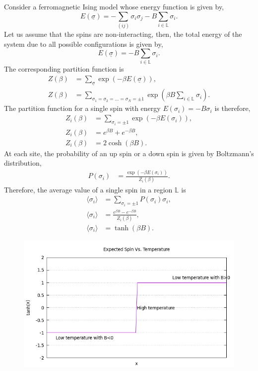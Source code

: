 \documentclass[letterpaper,english,10pt]{article}
\begin{document}
\begin{defn} Consider a ferromagnetic Ising model whose energy function is given by,
$$E(\underline{\sigma}) = -\sum_{(ij)}\sigma_{i}\sigma_{j} - B \sum_{i\in \mathbb{L}}\sigma_{i}.$$
Let us assume that the spins are non-interacting, then, the total energy of the system due to all possible configurations is given by,
\begin{equation}
E(\underline{\sigma}) = - B \sum_{i\in \mathbb{L}}\sigma_{i}.
\end{equation}
The corresponding partition function is
\begin{align}
Z(\beta) &= \sum_{\underline{\sigma}}\exp(-\beta E(\underline{\sigma})),\nonumber\\  
Z(\beta) &= \sum_{\sigma_{1}=\sigma_{2}=\ldots=\sigma_{N} = \pm 1}\exp(\beta B \sum_{i\in \mathbb{L}}\sigma_{i}).
\end{align}
The partition function for a single spin with energy            $E(\sigma_{i}) = -B\sigma_{i}$ is therefore,
\begin{align}
Z_{i}(\beta) &= \sum_{\sigma_{i} = \pm 1}\exp(-\beta E(\sigma_{i})),\nonumber\\  
Z_{i}(\beta) &= e^{\beta B}+ e^{-\beta B},\nonumber\\
Z_{i}(\beta) &= 2\cosh(\beta B).
\end{align}
At each site, the probability of an up spin or a down spin is given by Boltzmann's distribution,
\begin{align}
P(\sigma_{i}) &= \frac{\exp(-\beta E(\sigma_{i}))}{Z_{i}(\beta)}.
\end{align}
Therefore, the average value of a single spin in a region $\mathbb{L}$ is
\begin{align}
\langle\sigma_{i}\rangle &= \sum_{\sigma_{i}=\pm 1}P(\sigma_{i})\sigma_{i},\nonumber\\
\langle\sigma_{i}\rangle &= \frac{e^{\beta B}-e^{-\beta B}}{Z_{i}(\beta)},\nonumber\\
 \langle\sigma_{i}\rangle &= \tanh(\beta B).
\end{align}
\begin{figure}
\centering
\includegraphics[width=\textwidth]{Figures/tanh.png}

\end{figure}
\end{defn}
\end{document}
